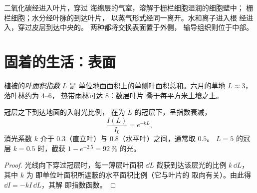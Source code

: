 \begin{example}[物质交换发生的场所]\label{ex:b1:flowering-plant-organization:where}
二氧化碳经进入叶片，穿过
海绵层的气室，溶解于栅栏细胞湿润的细胞壁中；
栅栏细胞；水分经叶脉的到达叶片，
以蒸气形式经同一离开。水和离子进入根
经进入，穿过皮层到达中央的。
两种都将交换表面置于外侧，
输导组织则位于中部。
\end{example}

\section{固着的生活：表面}

\begin{definition}[叶面积指数]\label{def:b1:flowering-plant-organization:lai}
植被的\emph{叶面积指数} $L$ 是
单位地面面积上的单侧叶面积总和。六月的草地
$L \approx 3$，落叶林约为 \qtyrange{4}{6}{}，
热带雨林可达 \qty{8}{}：数层叶片
叠于每平方米土壤之上。
\end{definition}

\begin{proposition}[冠层对光的截获]\label{prop:b1:flowering-plant-organization:beer}
冠层之下到达地面的入射光比例，
在为 $L$ 的冠层下，呈指数衰减，
\[
\frac{I(L)}{I_0} = e^{-kL},
\]
消光系数 $k$ 介于 $0.3$（直立叶）与
$0.8$（水平叶）之间，通常取 $0.5$。 $L = 5$ 的冠层
$k = 0.5$ 时，截获 $1 - e^{-2.5} = \qty{92}{\%}$ 的光。
\end{proposition}
\begin{proof}
光线向下穿过冠层时，每一薄层叶面积 $\dd L$
截获到达该层光的比例 $k\,\dd L$，其中 $k$ 为
即单位叶面积所遮蔽的水平面积比例（它与叶片的
取向有关）。由此得 $\dd I = -kI\,\dd L$，其解
即指数函数。
\end{proof}

